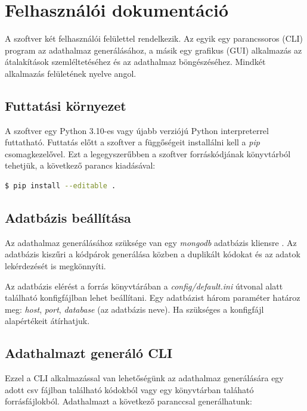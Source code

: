 \chapter{Felhasználói dokumentáció}
\label{ch:user}

A szoftver két felhasználói felülettel rendelkezik.
Az egyik egy parancssoros (CLI) program az adathalmaz generálásához,
a másik egy grafikus (GUI) alkalmazás az átalakítások szemléltetéséhez és az adathalmaz böngészéséhez.
Mindkét alkalmazás felületének nyelve angol.

\section{Futtatási környezet}

A szoftver egy Python 3.10-es vagy újabb verziójú Python interpreterrel futtatható.
Futtatás előtt a szoftver a függőségeit installálni kell a \emph{pip} csomagkezelővel.
Ezt a legegyszerűbben a szoftver forráskódjának könyvtárból tehetjük,
a következő parancs kiadásával:

\begin{lstlisting}[language=bash, numbers=none]
	$ pip install --editable .
\end{lstlisting}

\section{Adatbázis beállítása}

Az adathalmaz generálásához szüksége van egy \emph{mongodb} adatbázis kliensre \cite{installMongodb}.
Az adatbázis kiszűri a kódpárok generálása közben a duplikált kódokat
és az adatok lekérdezését is megkönnyíti.

Az adatbázis elérést a forrás könyvtárában a \emph{config/default.ini} útvonal alatt található
konfigfájlban lehet beállítani.
Egy adatbázist három paraméter határoz meg: \emph{host}, \emph{port}, \emph{database} (az adatbázis neve).
Ha szükséges a konfigfájl alapértékeit átírhatjuk.

\section{Adathalmazt generáló CLI}

Ezzel a CLI alkalmazással van lehetőségünk az adathalmaz generálására egy
adott csv fájlban található kódokból vagy egy könyvtárban taláható forrásfájlokból.
Adathalmazt a következő paranccsal generálhatunk:

